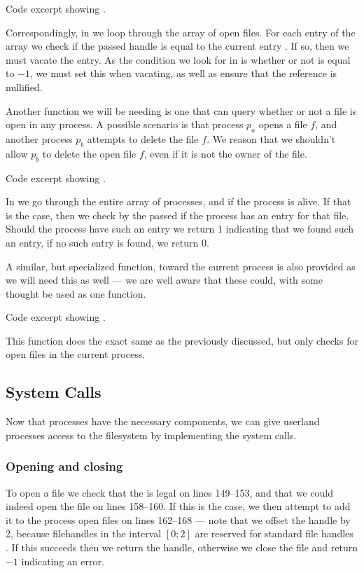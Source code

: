 {Code excerpt showing .}

Correspondingly, in  we loop through the
array of open files. For each entry of the array we check if the passed handle
is equal to the current entry . If so, then we must vacate
the entry. As the condition we look for in  is
whether or not  is equal to $-1$, we must set this when
vacating, as well as ensure that the  reference is nullified.

\newpage
Another function we will be needing is one that can query whether or not a
file is open in any process. A possible scenario is that process $p_a$ opens a
file $f$, and another process $p_b$ attempts to delete the file $f$. We reason
that we shouldn't allow $p_b$ to delete the open file $f$, even if it is not
the owner of the file.

{Code excerpt showing .}

In  we go through the entire array of processes,
and if the process is alive. If that is the case, then we check by the passed
 if the process has an entry for that file. Should the process
have such an entry we return 1 indicating that we found such an entry, if no
such entry is found, we return 0.

A similar, but specialized function, toward the current process is also
provided as we will need this as well --- we are well aware that these could,
with some thought be used as one function.

{Code excerpt showing .}

This function does the exact same as the previously discussed, but only checks
for open files in the current process.

\newpage
\subsection{System Calls}
Now that processes have the necessary components, we can give userland
processes access to the filesystem by implementing the system calls.

\subsubsection{Opening and closing}
To open a file we check that the  is legal on lines 149--153,
and that we could indeed open the file on lines 158--160. If this is the case,
we then attempt to add it to the process open files on lines 162--168 --- note
that we offset the handle by 2, because filehandles in the interval $[0;2]$
are reserved for standard file handles . If this
succeeds then we return the handle, otherwise we close the file and return
$-1$ indicating an error.


